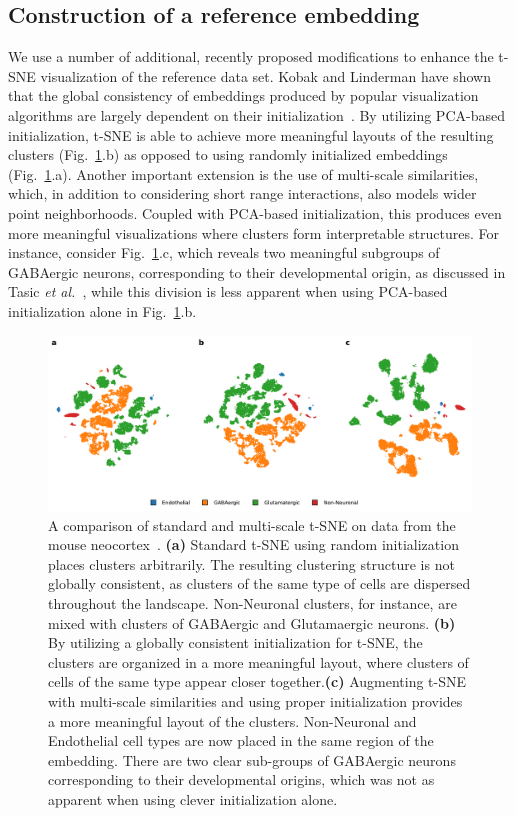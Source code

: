 \documentclass[runningheads]{llncs}
\newcommand{\etal}{\textit{et al.}}
\begin{document}
\subsection{Construction of a reference embedding}

We use a number of additional, recently proposed modifications to enhance the
t-SNE visualization of the reference data set. Kobak and Linderman have shown
that the global consistency of embeddings produced by popular visualization
algorithms are largely dependent on their initialization~\cite{Kobak2019a}. By utilizing PCA-based initialization, t-SNE is able to achieve more meaningful layouts of the resulting clusters (Fig.~\ref{fig:multiscale}.b) as opposed to using randomly initialized embeddings (Fig.~\ref{fig:multiscale}.a). Another important extension is the use of
multi-scale similarities, which, in addition to considering short range
interactions, also models wider point neighborhoods. Coupled with PCA-based
initialization, this produces even more meaningful visualizations where
clusters form interpretable structures. For instance, consider Fig.~\ref{fig:multiscale}.c, which reveals two meaningful subgroups of GABAergic
neurons, corresponding to their developmental origin, as discussed in
Tasic \etal~\cite{Tasic2018}, while this division is less apparent when using
PCA-based initialization alone in Fig.~\ref{fig:multiscale}.b.

\begin{figure}[htbp]
  \includegraphics[width=\textwidth]{tasic_multiscale.pdf}
  \caption{A comparison of standard and multi-scale t-SNE on data from the
   mouse neocortex~\cite{Tasic2018}. {\bf (a)} Standard t-SNE using random
   initialization places clusters arbitrarily. The resulting clustering
   structure is not globally consistent, as clusters of the same type of
   cells are dispersed throughout the landscape. Non-Neuronal clusters, for
   instance, are mixed with clusters of GABAergic and Glutamaergic neurons.
   {\bf (b)} By utilizing a globally consistent initialization for t-SNE, the
   clusters are organized in a more meaningful layout, where clusters of
   cells of the same type appear closer together.{\bf (c)} Augmenting t-SNE
   with multi-scale similarities and using proper initialization provides a
   more meaningful layout of the clusters. Non-Neuronal and Endothelial cell
   types are now placed in the same region of the embedding. There are two
   clear sub-groups of GABAergic neurons corresponding to their developmental
   origins, which was not as apparent when using clever initialization
   alone.}
  \label{fig:multiscale}
\end{figure}
\end{document}
